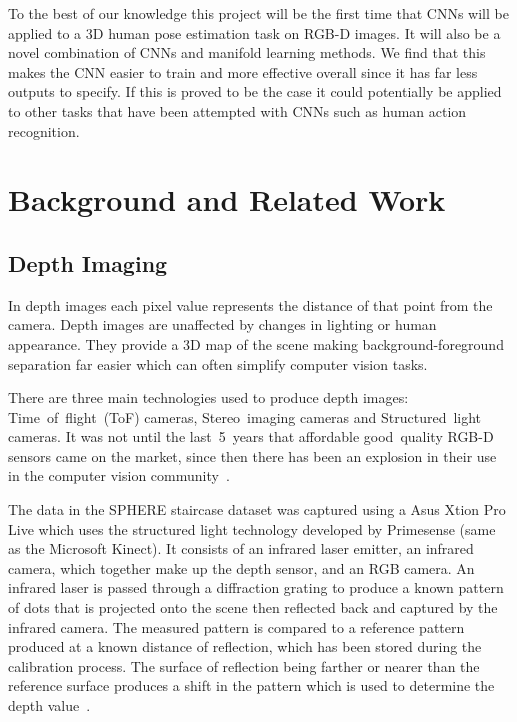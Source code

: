 \documentclass[11pt]{article} %
\begin{document}

To the best of our knowledge this project will be the first time that CNNs will be applied to a 3D human pose estimation task on RGB-D images. It will also be a novel combination of CNNs and manifold learning methods. We find that this makes the CNN easier to train and more effective overall since it has far less outputs to specify. If this is proved to be the case it could potentially be applied to other tasks that have been attempted with CNNs such as human action recognition.




\section{Background and Related Work}

\subsection{Depth Imaging}
\label{sec:Depth}


In depth images each pixel value represents the distance of that point from the camera. Depth images are unaffected by changes in lighting or human appearance. They provide a 3D map of the scene making background-foreground separation far easier which can often simplify computer vision tasks.\cite{Chen2013}

There are three main technologies used to produce depth images: Time~of~flight~(ToF) cameras, Stereo~imaging cameras and Structured~light cameras. It was not until the last~5~years that affordable good~quality RGB-D sensors came on the market, since then there has been an explosion in their use in the computer vision community~\cite{Han2013}.

 The data in the SPHERE staircase dataset was captured using a Asus Xtion Pro Live which uses the structured light technology developed by Primesense (same as the Microsoft Kinect). It consists of an infrared laser emitter, an infrared camera, which together make up the depth sensor, and an RGB camera. An infrared laser is passed through a diffraction grating to produce a known pattern of dots that is projected onto the scene then reflected back and captured by the infrared camera. The measured pattern is compared to a reference pattern produced at a known distance of reflection, which has been stored during the calibration process. The surface of reflection being farther or nearer than the reference surface produces a shift in the pattern which is used to determine the depth value~\cite{Zhang2012a,Khoshelham2012a}.
\end{document}
